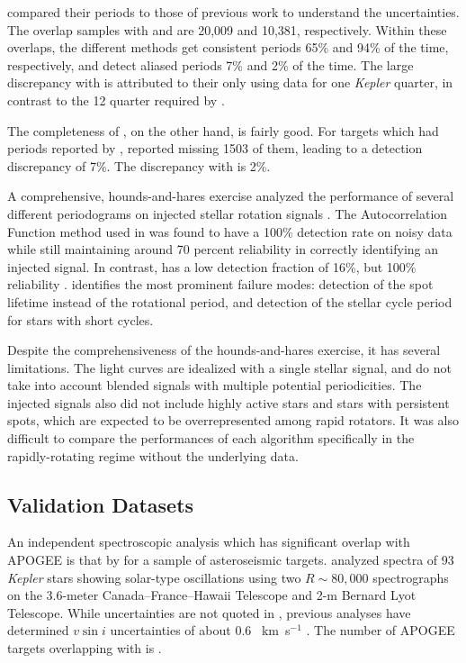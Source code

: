 \documentclass[manuscript]{aastex6}
\newcommand{\vsini}{\ensuremath{v \sin i}}
\newcommand{\Kepler}{\mbox{\textit{Kepler}}}
\newcommand{\kms}{\textrm{~km~s}\ensuremath{^{-1}}}
\begin{document}
\citet{McQuillan14} compared their periods to those of previous work
\citep{Reinhold13,Nielsen13} to understand the uncertainties. The overlap 
samples with \citet{Reinhold13} and \citet{Nielsen13} are 20,009 and 10,381,
respectively. Within these overlaps, the different methods get
consistent periods 65\% and 94\% of the time, respectively, and detect
aliased periods 7\% and 2\% of the time. The large discrepancy with
\citet{Reinhold13} is attributed to their only using data for one
\Kepler{} quarter, in contrast to the 12 quarter required by 
\citet{McQuillan14}.

The completeness of \citet{McQuillan14}, on the other hand, is fairly
good. For targets which had periods reported by \citet{Reinhold13},
\citet{McQuillan14} reported missing 1503 of them, leading to a
detection
discrepancy of 7\%. The discrepancy with \citet{Nielsen13} is 2\%.

A comprehensive, hounds-and-hares exercise analyzed the performance of
several different periodograms on injected stellar rotation signals 
\citep{Aigrain15}. The Autocorrelation Function method used in 
\citet{McQuillan14} was found to have a 100\% detection rate on noisy
data while still maintaining around 70 percent reliability in correctly
identifying an injected signal. In contrast, \citet{Nielsen13} has a
low
detection fraction of 16\%, but 100\% reliability \citep{Aigrain15}.
\citet{Aigrain15} identifies the most prominent failure modes:
detection
of the spot lifetime instead of the rotational period, and detection of
the stellar cycle period for stars with short cycles.

Despite the comprehensiveness of the hounds-and-hares exercise, it has
several limitations. The light curves are idealized with a single
stellar signal, and do not take into account blended signals with
multiple potential periodicities. The injected signals also did not
include highly active stars and stars with persistent spots, which are
expected to be overrepresented among rapid rotators. It was also
difficult to compare the performances of each algorithm specifically in
the rapidly-rotating regime without the underlying data.


\subsection{Validation Datasets}

An independent spectroscopic analysis which has significant overlap with APOGEE
is that by \citet{Bruntt12} for a sample of asteroseismic targets.
\citet{Bruntt12} analyzed spectra of 93 \Kepler{} stars showing solar-type
oscillations using two \(R \sim 80,000\) spectrographs 
on the 3.6-meter Canada--France--Hawaii Telescope and 2-m Bernard Lyot
Telescope. While uncertainties are not quoted in \citet{Bruntt12},
previous analyses have determined \vsini{} uncertainties of about 0.6
\kms{} \citep{Bruntt10a,Bruntt10b}.  The
number of APOGEE targets overlapping with \citet{Bruntt12} is .
\end{document}
